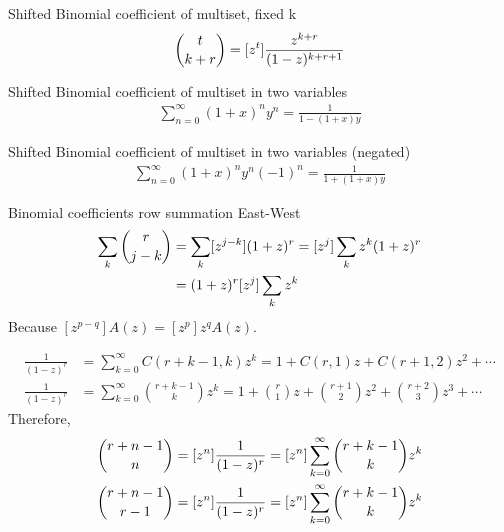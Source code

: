 \begin{identity}
    Shifted Binomial coefficient of multiset, fixed k
    \begin{align*}
        \binom{t}{k+r} = [z^{t}] \frac{z^{k+r}}{(1-z)^{k+r+1}}
    \end{align*}
\end{identity}
\begin{identity}
    Shifted Binomial coefficient of multiset in two variables~\cite[eq. 15]{faris2011generating}
    \begin{align*}
        \sum_{n=0}^{\infty} (1 + x)^n y^n = \frac{1}{1 - (1 + x)y}
    \end{align*}
\end{identity}
\begin{identity}
    Shifted Binomial coefficient of multiset in two variables (negated)
    \begin{align*}
        \sum_{n=0}^{\infty} (1 + x)^n y^n (-1)^n = \frac{1}{1 + (1 + x)y}
    \end{align*}
\end{identity}
\begin{identity}
    Binomial coefficients row summation East-West
    \begin{align*}
        \sum_{k} \binom{r}{j-k}
        &= \sum_{k} [z^{j-k}](1+z)^r
        = [z^{j}] \sum_{k} z^k (1+z)^r \\
        &= (1+z)^r [z^{j}] \sum_{k} z^k
    \end{align*}
    Because $[z^{p-q}] A(z)=[z^p] z^{q} A(z)$.
\end{identity}

\begin{identity}
    \begin{align*}
        \frac{1}{(1-z)^r} &= \sum_{k=0}^\infty C(r+k-1,k) z^k = 1 + C(r,1) z + C(r+1,2) z^2 + \cdots \\
        \frac{1}{(1-z)^r} &= \sum_{k=0}^\infty \binom{r+k-1}{k} z^k = 1 + \binom{r}{1} z + \binom{r+1}{2} z^2 + \binom{r+2}{3} z^3 + \cdots
    \end{align*}
    Therefore,
    \begin{align*}
        \binom{r+n-1}{n}   &= [z^{n}] \frac{1}{(1-z)^r} = [z^{n}] \sum_{k=0}^\infty \binom{r+k-1}{k} z^k \\
        \binom{r+n-1}{r-1} &= [z^{n}] \frac{1}{(1-z)^r} = [z^{n}] \sum_{k=0}^\infty \binom{r+k-1}{k} z^k
    \end{align*}
\end{identity}




\clearpage
